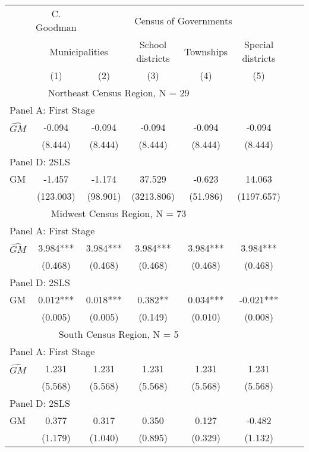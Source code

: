  \begin{tabular}{l*{7}{c}} \toprule
&\multicolumn{1}{c}{C. Goodman}&\multicolumn{4}{c}{Census of Governments}\\\cmidrule(lr){2-2}\cmidrule(lr){3-6}&\multicolumn{2}{c}{Municipalities}&\multicolumn{1}{c}{School districts}&\multicolumn{1}{c}{Townships}&\multicolumn{1}{c}{Special districts}\\\cmidrule(lr){2-3}\cmidrule(lr){4-6}&\multicolumn{1}{c}{(1)}&\multicolumn{1}{c}{(2)}&\multicolumn{1}{c}{(3)}&\multicolumn{1}{c}{(4)}&\multicolumn{1}{c}{(5)}\\
\cmidrule(lr){1-6}
\multicolumn{5}{c}{Northeast Census Region, N = 29}\\\cmidrule(lr){1-6}
\multicolumn{5}{l}{Panel A: First Stage}\\
\cmidrule(lr){1-6}
$\widehat{GM}$  &   -0.094   &   -0.094   &   -0.094   &   -0.094   &   -0.094   \\
                &  (8.444)   &  (8.444)   &  (8.444)   &  (8.444)   &  (8.444)   \\
\cmidrule(lr){1-6}
\multicolumn{5}{l}{Panel D: 2SLS}\\
\cmidrule(lr){1-6}
GM              &   -1.457   &   -1.174   &   37.529   &   -0.623   &   14.063   \\
                &(123.003)   & (98.901)   &(3213.806)   & (51.986)   &(1197.657)   \\

\cmidrule(lr){1-6}
\multicolumn{5}{c}{Midwest Census Region, N = 73}\\\cmidrule(lr){1-6}
\multicolumn{5}{l}{Panel A: First Stage}\\
\cmidrule(lr){1-6}
$\widehat{GM}$  &    3.984***&    3.984***&    3.984***&    3.984***&    3.984***\\
                &  (0.468)   &  (0.468)   &  (0.468)   &  (0.468)   &  (0.468)   \\
\cmidrule(lr){1-6}
\multicolumn{5}{l}{Panel D: 2SLS}\\
\cmidrule(lr){1-6}
GM              &    0.012***&    0.018***&    0.382** &    0.034***&   -0.021***\\
                &  (0.005)   &  (0.005)   &  (0.149)   &  (0.010)   &  (0.008)   \\

\cmidrule(lr){1-6}
\multicolumn{5}{c}{South Census Region, N = 5}\\\cmidrule(lr){1-6}
\multicolumn{5}{l}{Panel A: First Stage}\\
\cmidrule(lr){1-6}
$\widehat{GM}$  &    1.231   &    1.231   &    1.231   &    1.231   &    1.231   \\
                &  (5.568)   &  (5.568)   &  (5.568)   &  (5.568)   &  (5.568)   \\
\cmidrule(lr){1-6}
\multicolumn{5}{l}{Panel D: 2SLS}\\
\cmidrule(lr){1-6}
GM              &    0.377   &    0.317   &    0.350   &    0.127   &   -0.482   \\
                &  (1.179)   &  (1.040)   &  (0.895)   &  (0.329)   &  (1.132)   \\


\end{tabular}
